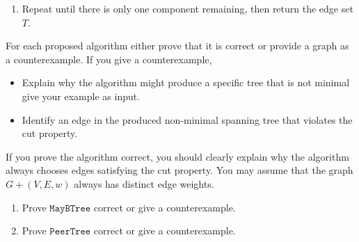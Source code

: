 \documentclass[12 pt, letterpaper]{hmcpset}
\begin{document}
\begin{problem}
\begin{enumerate}
\begin{enumerate}
				\item Repeat until there is only one component remaining, then return the edge set $T$.
			\end{enumerate}
	\end{enumerate}

	For each proposed algorithm either prove that it is correct or provide a graph as a counterexample. If you give a counterexample,
	\begin{itemize}
		\item Explain why the algorithm might produce a specific tree that is not minimal give your example as input.

		\item Identify an edge in the produced non-minimal spanning tree that violates the cut property.
	\end{itemize}

	If you prove the algorithm correct, you should clearly explain why the algorithm always chooses edges satisfying the cut property. You may assume that the graph $G + (V, E, w)$ always has distinct edge weights.
	\begin{enumerate}[label = \alph*.]
		\item Prove $\mathtt{MayBTree}$ correct or give a counterexample.
		\item Prove $\mathtt{PeerTree}$ correct or give a counterexample.
	\end{enumerate}
\end{problem}
\end{document}
